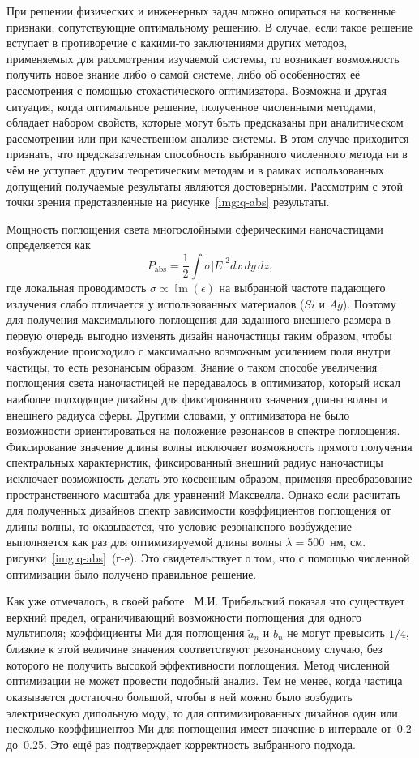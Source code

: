 При решении физических и инженерных задач можно опираться на косвенные
признаки, сопутствующие оптимальному решению.  В случае, если такое
решение вступает в противоречие с какими-то заключениями других
методов, применяемых для рассмотрения изучаемой системы, то возникает
возможность получить новое знание либо о самой системе, либо об
особенностях её рассмотрения с помощью стохастического
оптимизатора. Возможна и другая ситуация, когда оптимальное решение,
полученное численными методами, обладает набором свойств, которые
могут быть предсказаны при аналитическом рассмотрении или при
качественном анализе системы. В этом случае приходится признать, что
предсказательная способность выбранного численного метода ни в чём не
уступает другим теоретическим методам и в рамках использованных
допущений получаемые результаты являются достоверными. Рассмотрим с
этой точки зрения представленные на рисунке~\ref{img:q-abs}
результаты.

Мощность поглощения света многослойными сферическими наночастицами
определяется как
\[
  P_{\mathrm {abs}}=\frac{1}{2}\int\sigma \left|E\right|^2dx\,dy\,dz,
\]
где локальная проводимость
$\sigma\propto \operatorname{\mathbb{I}m} (\epsilon)$ на выбранной
частоте падающего излучения слабо отличается у использованных
материалов ($Si$ и $Ag$).  Поэтому для получения максимального
поглощения для заданного внешнего размера в первую очередь выгодно
изменять дизайн наночастицы таким образом, чтобы возбуждение
происходило с максимально возможным усилением поля внутри частицы, то
есть резонансым образом.  Знание о таком способе увеличения поглощения
света наночастицей не передавалось в оптимизатор, который искал
наиболее подходящие дизайны для фиксированного значения длины волны и
внешнего радиуса сферы.  Другими словами, у оптимизатора не было
возможности ориентироваться на положение резонансов в спектре
поглощения. Фиксирование значение длины волны исключает возможность
прямого получения спектральных характеристик, фиксированный внешний
радиус наночастицы исключает возможность делать это косвенным образом,
применяя преобразование пространственного масштаба для уравнений
Максвелла. Однако если расчитать для полученных дизайнов спектр
зависимости коэффициентов поглощения от длины волны, то оказывается,
что условие резонансного возбуждение выполняется как раз для
оптимизируемой длины волны $\lambda=500$~нм,
см. рисунки~\ref{img:q-abs}~(г-е).  Это свидетельствует о том, что с
помощью численной оптимизации было получено правильное решение.

Как уже отмечалось, в своей работе~\cite{Tribelsky-2011}
М.И. Трибельский показал что существует верхний предел, ограничивающий
возможности поглощения для одного мультиполя; коэффициенты Ми для
поглощения $\tilde{a}_n$ и $\tilde{b}_n$ не могут превысить $1/4$,
близкие к этой величине значения соответствуют резонансному случаю,
без которого не получить высокой эффективности поглощения.  Метод
численной оптимизации не может провести подобный анализ.  Тем не
менее, когда частица оказывается достаточно большой, чтобы в ней можно
было возбудить электрическую дипольную моду, то для оптимизированных
дизайнов один или несколько коэффициентов Ми для поглощения имеет
значение в интервале от~0.2 до~0.25.  Это ещё  раз подтверждает
корректность выбранного подхода.

